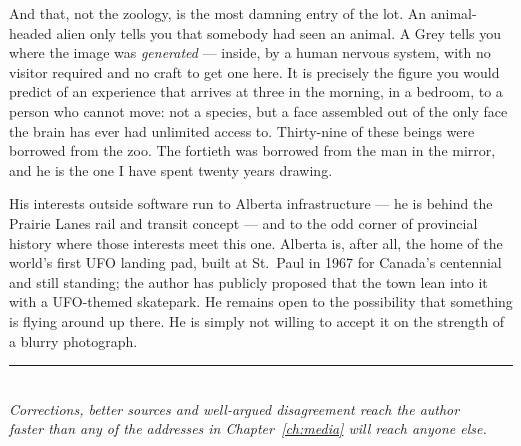 \vspace{4pt}\par
\noindent And that, not the zoology, is the most damning entry of the lot. An animal-headed alien only
tells you that somebody had seen an animal. A Grey tells you where the image was
\emph{generated} --- inside, by a human nervous system, with no visitor required and no craft
to get one here. It is precisely the figure you would predict of an experience that arrives at
three in the morning, in a bedroom, to a person who cannot move: not a species, but a face
assembled out of the only face the brain has ever had unlimited access to. Thirty-nine of these
beings were borrowed from the zoo. The fortieth was borrowed from the man in the
mirror, and he is the one I have spent twenty years drawing.

His interests outside software run to Alberta infrastructure --- he is behind the Prairie Lanes
rail and transit concept --- and to the odd corner of provincial history where those interests meet
this one. Alberta is, after all, the home of the world's first UFO landing pad, built at St.\ Paul
in 1967 for Canada's centennial and still standing; the author has publicly proposed that the town
lean into it with a UFO-themed skatepark. He remains open to the possibility that something is
flying around up there. He is simply not willing to accept it on the strength of a blurry
photograph.

\vspace{16pt}
\begin{center}
{\color{ufogreen}\rule{0.34\textwidth}{2.2pt}}\\[13pt]
{\footnotesize\itshape\color{steel} Corrections, better sources and well-argued disagreement
reach the author\\ faster than any of the addresses in Chapter~\ref{ch:media} will reach anyone else.}
\end{center}
